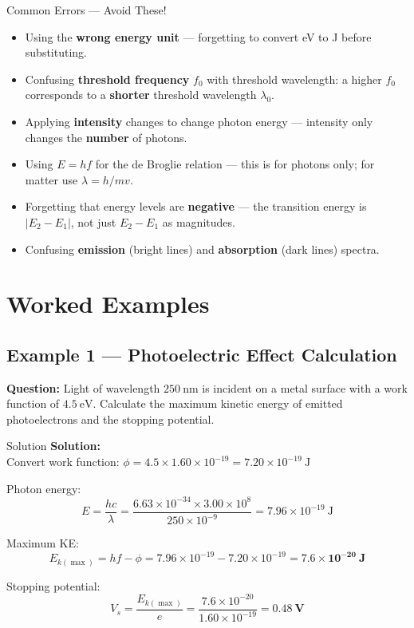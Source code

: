 \begin{warningbox}{Common Errors — Avoid These!}
\begin{itemize}[itemsep=3pt]
  \item Using the \textbf{wrong energy unit} — forgetting to convert eV to J before substituting.
  \item Confusing \textbf{threshold frequency} $f_0$ with threshold wavelength: a higher $f_0$ corresponds to a \textbf{shorter} threshold wavelength $\lambda_0$.
  \item Applying \textbf{intensity} changes to change photon energy — intensity only changes the \textbf{number} of photons.
  \item Using $E = hf$ for the de Broglie relation — this is for photons only; for matter use $\lambda = h/mv$.
  \item Forgetting that energy levels are \textbf{negative} — the transition energy is $|E_2 - E_1|$, not just $E_2 - E_1$ as magnitudes.
  \item Confusing \textbf{emission} (bright lines) and \textbf{absorption} (dark lines) spectra.
\end{itemize}
\end{warningbox}

\section{Worked Examples}

\subsection*{Example 1 — Photoelectric Effect Calculation}

\textbf{Question:} Light of wavelength $250\ \text{nm}$ is incident on a metal surface with a work function of $4.5\ \text{eV}$. Calculate the maximum kinetic energy of emitted photoelectrons and the stopping potential.

\begin{examplebox}{Solution}
\textbf{Solution:}\\
Convert work function: $\phi = 4.5 \times 1.60\times10^{-19} = 7.20\times10^{-19}\ \text{J}$

Photon energy:
$$E = \frac{hc}{\lambda} = \frac{6.63\times10^{-34} \times 3.00\times10^{8}}{250\times10^{-9}} = 7.96\times10^{-19}\ \text{J}$$

Maximum KE:
$$E_{k(\max)} = hf - \phi = 7.96\times10^{-19} - 7.20\times10^{-19} = \mathbf{7.6\times10^{-20}\ \text{J}}$$

Stopping potential:
$$V_s = \frac{E_{k(\max)}}{e} = \frac{7.6\times10^{-20}}{1.60\times10^{-19}} = \mathbf{0.48\ \text{V}}$$
\end{examplebox}

